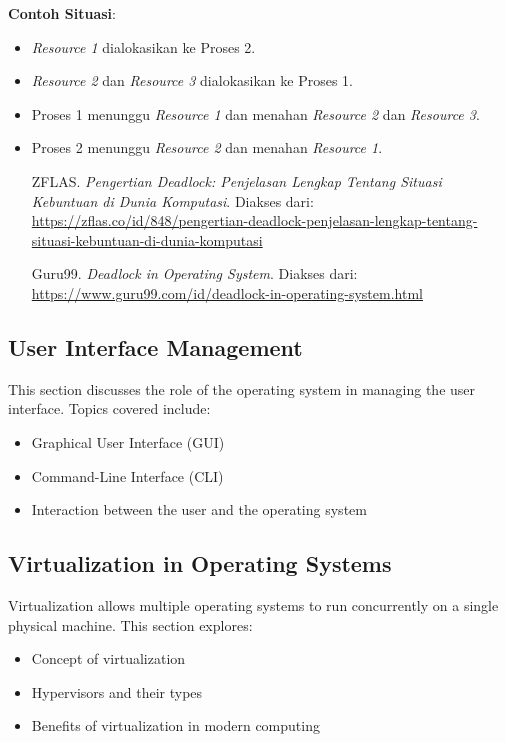 \documentclass[12pt]{article}
\begin{document}
\textbf{Contoh Situasi}:
\begin{itemize}
    \item \textit{Resource 1} dialokasikan ke Proses 2.
    \item \textit{Resource 2} dan \textit{Resource 3} dialokasikan ke Proses 1.
    \item Proses 1 menunggu \textit{Resource 1} dan menahan \textit{Resource 2} dan \textit{Resource 3}.
    \item Proses 2 menunggu \textit{Resource 2} dan menahan \textit{Resource 1}.

    \begin{thebibliography}{9}

ZFLAS. 
\textit{Pengertian Deadlock: Penjelasan Lengkap Tentang Situasi Kebuntuan di Dunia Komputasi}. 
Diakses dari: \url{https://zflas.co/id/848/pengertian-deadlock-penjelasan-lengkap-tentang-situasi-kebuntuan-di-dunia-komputasi}

Guru99. 
\textit{Deadlock in Operating System}. 
Diakses dari: \url{https://www.guru99.com/id/deadlock-in-operating-system.html}

\end{thebibliography}


\end{itemize}
    




\subsection{User Interface Management}
This section discusses the role of the operating system in managing the user interface. Topics covered include:
\begin{itemize}
    \item Graphical User Interface (GUI)
    \item Command-Line Interface (CLI)
    \item Interaction between the user and the operating system
\end{itemize}

\subsection{Virtualization in Operating Systems}
Virtualization allows multiple operating systems to run concurrently on a single physical machine. This section explores:
\begin{itemize}
    \item Concept of virtualization
    \item Hypervisors and their types
    \item Benefits of virtualization in modern computing
\end{itemize}
\end{document}
